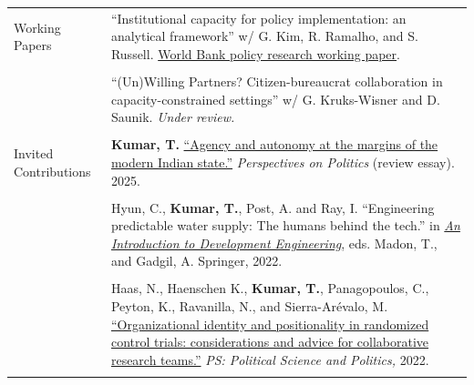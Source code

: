 \documentclass[letterpaper, 10.5pt]{article}
\begin{document}
\begin{longtable}{p{1.5in}p{5in}}
Working Papers

&``Institutional capacity for policy implementation: an analytical framework'' w/ G. Kim, R. Ramalho, and S. Russell. \href{https://documents.worldbank.org/en/publication/documents-reports/documentdetail/099635001072670597}{World Bank policy research working paper}.\\
& \\
&``(Un)Willing Partners? Citizen-bureaucrat collaboration in capacity-constrained settings'' w/ G. Kruks-Wisner and D. Saunik. \textit{Under review.} \\
& \\







{{Invited Contributions}} 

& \textbf{Kumar, T.} \href{https://doi.org/10.1017/S1537592725000714}{``Agency and autonomy at the margins of the modern Indian state.''} \textit{Perspectives on Politics} (review essay). 2025.\\
&\\
& Hyun, C., \textbf{Kumar, T.}, Post, A. and Ray, I. ``Engineering predictable water supply: The humans behind the tech.'' in \href{https://link.springer.com/book/10.1007/978-3-030-86065-3}{\textit{An Introduction to Development Engineering}}, eds. Madon, T., and Gadgil, A. Springer, 2022.\\

& \\

& Haas, N., Haenschen K., \textbf{Kumar, T.}, Panagopoulos, C., Peyton, K., Ravanilla, N., and Sierra-Ar\'{e}valo, M. \href{https://www.doi.org/10.1017/S1049096522000026}{``Organizational identity and positionality in randomized control trials: considerations and advice for collaborative research teams.''} \textit{PS: Political Science and Politics,} 2022. \\
& \\






\end{longtable}
\end{document}
